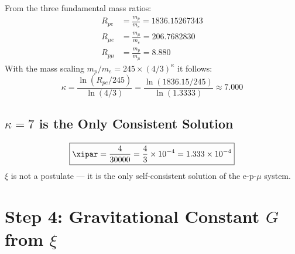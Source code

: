 From the three fundamental mass ratios:
\begin{align}
	R_{pe} &= \frac{m_p}{m_e} = 1836{.}15267343 \\
	R_{\mu e} &= \frac{m_{\mu}}{m_e} = 206{.}7682830 \\
	R_{p\mu} &= \frac{m_p}{m_{\mu}} = 8{.}880
\end{align}
With the mass scaling $m_p / m_e = 245 \times (4/3)^\kappa$ it follows:
\begin{equation}
	\kappa = \frac{\ln(R_{pe}/245)}{\ln(4/3)} = \frac{\ln(1836{.}15/245)}{\ln(1{.}3333)} \approx 7{.}000
\end{equation}

\subsection{\texorpdfstring{$\kappa = 7$}{kappa = 7} is the Only Consistent Solution}

\begin{table}[h]
\centering
{}
\caption{$\kappa = 7$ is the only consistent solution}
\end{table}

\begin{keyresult}
\begin{equation}
	\boxed{\xipar = \frac{4}{30000} = \frac{4}{3} \times 10^{-4} = 1{.}333 \times 10^{-4}}
\end{equation}
$\xi$ is not a postulate — it is the only self-consistent solution of the e-p-$\mu$ system.
\end{keyresult}

\section{Step 4: Gravitational Constant \texorpdfstring{$G$}{G} from \texorpdfstring{$\xi$}{xi}}

